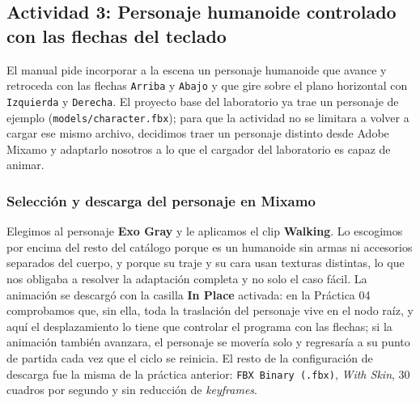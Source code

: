 \subsection{Actividad 3: Personaje humanoide controlado con las flechas del teclado}

El manual pide incorporar a la escena un personaje humanoide que avance y retroceda con las flechas \texttt{Arriba} y \texttt{Abajo} y que gire sobre el plano horizontal con \texttt{Izquierda} y \texttt{Derecha}. El proyecto base del laboratorio ya trae un personaje de ejemplo (\texttt{models/character.fbx}); para que la actividad no se limitara a volver a cargar ese mismo archivo, decidimos traer un personaje distinto desde Adobe Mixamo y adaptarlo nosotros a lo que el cargador del laboratorio es capaz de animar.

\subsubsection{Selección y descarga del personaje en Mixamo}
Elegimos al personaje \textbf{Exo Gray} y le aplicamos el clip \textbf{Walking}. Lo escogimos por encima del resto del catálogo porque es un humanoide sin armas ni accesorios separados del cuerpo, y porque su traje y su cara usan texturas distintas, lo que nos obligaba a resolver la adaptación completa y no solo el caso fácil. La animación se descargó con la casilla \textbf{In Place} activada: en la Práctica 04 comprobamos que, sin ella, toda la traslación del personaje vive en el nodo raíz, y aquí el desplazamiento lo tiene que controlar el programa con las flechas; si la animación también avanzara, el personaje se movería solo y regresaría a su punto de partida cada vez que el ciclo se reinicia. El resto de la configuración de descarga fue la misma de la práctica anterior: \texttt{FBX Binary (.fbx)}, \textit{With Skin}, 30 cuadros por segundo y sin reducción de \textit{keyframes}.

